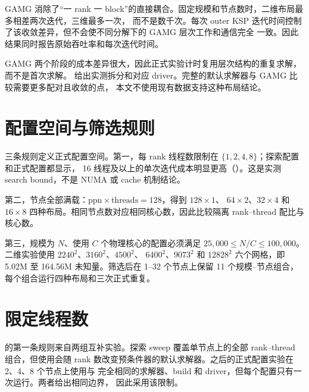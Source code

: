 \documentclass[11pt,a4paper,oneside]{report}
\begin{document}
GAMG 消除了“一 rank 一 block”的直接耦合。固定规模和节点数时，二维布局最多相差两次迭代，三维最多一次，
而不是数千次。每次 outer KSP 迭代时间控制了该收敛差异，但不会使不同分解下的 GAMG 层次工作和通信完全
一致。因此结果同时报告原始吞吐率和每次迭代时间。

GAMG 两个阶段的成本差异很大，因此正式实验计时复用层次结构的重复求解，而不是首次求解。
 给出实测拆分和对应 driver。完整的默认求解器与 GAMG 比较需要更多配对且收敛的点，
本文不使用现有数据支持这种布局结论。

\section{配置空间与筛选规则}
\label{sec:configspace}
三条规则定义正式配置空间。第一，每 rank 线程数限制在 $\{1,2,4,8\}$；探索配置和正式配置都显示，
16 线程及以上的单次迭代成本明显更高（）。这是实测 search bound，不是 NUMA 或
cache 机制结论。

第二，节点全部满载：$\text{ppn} \times \text{threads} = 128$，得到 $128\times1$、
$64\times2$、$32\times4$ 和 $16\times8$ 四种布局。相同节点数对应相同核心数，因此比较隔离
rank--thread 配比与核心数。

第三，规模为 $N$、使用 $C$ 个物理核心的配置必须满足
$25{,}000 \leq N/C \leq 100{,}000$。二维实验使用 $2240^2$、$3160^2$、$4500^2$、
$6400^2$、$9073^2$ 和 $12828^2$ 六个网格，即 5.02M 至 164.56M 未知量。筛选后在 1--32
个节点上保留 11 个规模--节点组合，每个组合运行四种布局和三次正式重复。

\section{限定线程数}
\label{sec:sweep}
 的第一条规则来自两组互补实验。探索 sweep 覆盖单节点上的全部 rank--thread
组合，但使用会随 rank 数改变预条件器的默认求解器。之后的正式配置实验在 2、4、8 个节点上使用与
 完全相同的求解器、build 和 driver，但每个配置只有一次运行。两者给出相同边界，
因此采用该限制。
\end{document}
